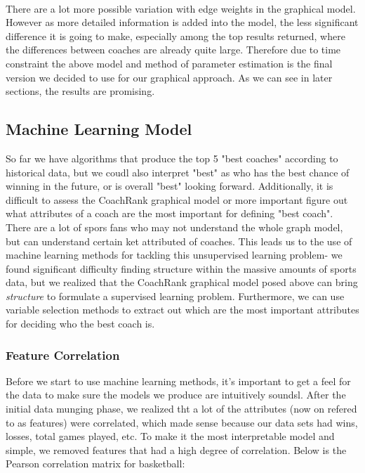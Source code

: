 \documentclass[titlepage,12pt]{article}
\begin{document}
\noindent 
\\

\noindent There are a lot more possible variation with edge weights in the graphical model. However as more detailed information is added into the model, the less significant difference it is going to make, especially among the top results returned, where the differences between coaches are already quite large. Therefore due to time constraint the above model and method of parameter estimation is the final version we decided to use for our graphical approach. As we can see in later sections, the results are promising.

\subsection{Machine Learning Model}

\noindent So far we have algorithms that produce the top 5 "best coaches" according to historical data, but we coudl also interpret "best" as who has the best chance of winning in the future, or is overall "best" looking forward. Additionally, it is difficult to assess the CoachRank graphical model or more important figure out what attributes of a coach are the most important for defining "best coach". There are a lot of spors fans who may not understand the whole graph model, but can understand certain ket attributed of coaches. This leads us to the use of machine learning methods for tackling this unsupervised learning problem- we found significant difficulty finding structure within the massive amounts of sports data, but we realized that the CoachRank graphical model posed above can bring \textit{structure} to formulate a supervised learning problem. Furthermore, we can use variable selection methods to extract out which are the most important attributes for deciding who the best coach is. 

\subsubsection*{Feature Correlation}

\noindent Before we start to use machine learning methods, it's important to get a feel for the data to make sure the models we produce are intuitively soundsl. After the initial data munging phase, we realized tht a lot of the attributes (now on refered to as features) were correlated, which made sense because our data sets had wins, losses, total games played, etc. To make it the most interpretable model and simple, we removed features that had a high degree of correlation. Below is the Pearson correlation matrix for basketball: 
\end{document}
